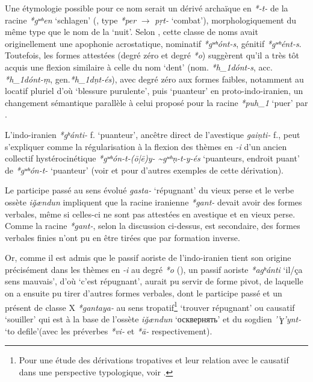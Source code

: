 \documentclass[11pt]{article}
\newcommand{\ipa}[1]{{\phon\textit{#1}}}
\newcommand{\forme}[1]{{\phon#1}}
\begin{document}
Une étymologie possible pour ce nom serait un dérivé  archaïque en \ipa{*-t-} de la racine \ipa{*gʷʰen} `schlagen' (\citealt[218]{liv}, type \ipa{*per} $\rightarrow$ \ipa{pṛt-} `combat'), morphologiquement du même type que le nom de la `nuit'. Selon \citet{schindler67nekuz}, cette classe de noms avait originellement une apophonie acrostatique, nominatif \ipa{*gʷʰónt-s}, génitif \ipa{*gʷʰént-s}. Toutefois, les formes attestées (degré zéro et degré \ipa{*o}) suggèrent qu'il a très tôt acquis une flexion similaire à celle du nom `dent' (nom. \ipa{*h_1dónt-s}, acc. \ipa{*h_1dónt-ṃ}, gen.\ipa{*h_1dṇt-és}), avec degré zéro aux formes faibles, notamment au locatif pluriel d'où `blessure purulente', puis `puanteur' en proto-indo-iranien, un changement sémantique parallèle à celui proposé pour la racine \ipa{*puh_1} `puer' par \citet{garnier16secondary}.
 
L'indo-iranien \ipa{*gʰánti-} f. `puanteur', ancêtre direct de l'avestique \ipa{gaiṇti-} f., peut s'expliquer comme la régularisation à la flexion des thèmes en \ipa{-i} d'un ancien collectif hystérocinétique \ipa{*gʷʰón-t-(ō|ē)y- \textasciitilde *gʷʰṇ-t-y-és} `puanteurs, endroit puant' de  \ipa{*gʷʰón-t-} `puanteur' (voir \citealt{oettinger95kollektiv} et \citealt{ garnier13ghosti} pour d'autres exemples de cette dérivation).

Le participe passé au sens évolué \ipa{gasta-} `répugnant' du vieux perse et le verbe ossète \ipa{iǧændun} impliquent que la racine iranienne \ipa{*gant-} devait avoir des formes verbales, même si celles-ci ne sont pas attestées en avestique et en vieux perse. Comme la racine \ipa{*gant-}, selon la discussion ci-dessus, est secondaire, des formes verbales finies n'ont pu en être tirées que par formation inverse. 

Or, comme il est admis que le passif aoriste de l'indo-iranien tient son origine précisément dans les thèmes en \ipa{-i} au degré \ipa{*o} (\citealt[15]{kummel96stativ}), un passif aoriste \ipa{*agʰánti} `il/ça sens mauvais', d'où `c'est répugnant', aurait pu servir de forme pivot, de laquelle on a ensuite pu tirer d'autres formes verbales, dont le participe passé et un présent de classe X \ipa{*gantaya-} au sens  tropatif\footnote{Pour une étude des dérivations tropatives et leur relation avec le causatif dans une perspective typologique, voir \citet{jacques13tropative}.} `trouver répugnant' ou causatif `souiller' qui est à la base de l'ossète \ipa{iǧændun} `\forme{осквернять}' et du sogdien \ipa{’’ɣ’ynt-} ‘to defile'(avec les préverbes \ipa{*vi-} et \ipa{*ā-} respectivement).
\end{document}
